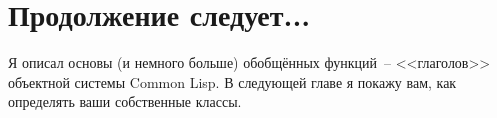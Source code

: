 \section{Продолжение следует...}

Я описал основы (и немного больше) обобщённых функций~-- <<глаголов>> объектной системы
Common Lisp.  В следующей главе я покажу вам, как определять ваши собственные классы.


